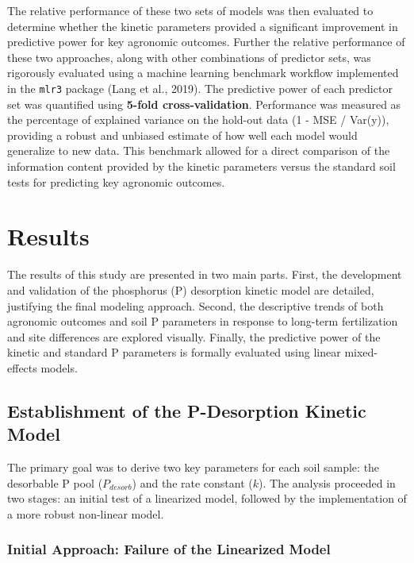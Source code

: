 \documentclass[
  a4paper,
]{article}
\begin{document}
The relative performance of these two sets of models was then evaluated
to determine whether the kinetic parameters provided a significant
improvement in predictive power for key agronomic outcomes. Further the
relative performance of these two approaches, along with other
combinations of predictor sets, was rigorously evaluated using a machine
learning benchmark workflow implemented in the \texttt{mlr3} package
(Lang et al., 2019). The predictive power of each predictor set was
quantified using \textbf{5-fold cross-validation}. Performance was
measured as the percentage of explained variance on the hold-out data (1
- MSE / Var(y)), providing a robust and unbiased estimate of how well
each model would generalize to new data. This benchmark allowed for a
direct comparison of the information content provided by the kinetic
parameters versus the standard soil tests for predicting key agronomic
outcomes.

\newpage

\section{Results}\label{results}

The results of this study are presented in two main parts. First, the
development and validation of the phosphorus (P) desorption kinetic
model are detailed, justifying the final modeling approach. Second, the
descriptive trends of both agronomic outcomes and soil P parameters in
response to long-term fertilization and site differences are explored
visually. Finally, the predictive power of the kinetic and standard P
parameters is formally evaluated using linear mixed-effects models.

\subsection{Establishment of the P-Desorption Kinetic
Model}\label{establishment-of-the-p-desorption-kinetic-model}

The primary goal was to derive two key parameters for each soil sample:
the desorbable P pool (\(P_{desorb}\)) and the rate constant (\(k\)).
The analysis proceeded in two stages: an initial test of a linearized
model, followed by the implementation of a more robust non-linear model.

\subsubsection{Initial Approach: Failure of the Linearized
Model}\label{initial-approach-failure-of-the-linearized-model}
\end{document}
